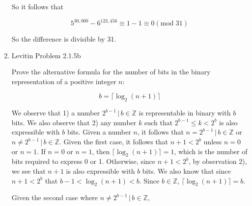 \documentclass[a4paper,12pt]{article}
\begin{document}
\begin{enumerate}
    So it follows that

    $$5^{30,000} - 6^{123,456} \equiv 1 - 1 \equiv 0 (\text{mod } 31)$$

    So the difference is divisible by 31.

    \item Levitin Problem 2.1.5b

    Prove the alternative formula for the number of bits in the binary representation of a positive integer $n$:

    $$b = \lceil \log_2(n+1)\rceil$$

    We observe that 1) a number $2^{b-1} \,|\, b \in \mathds{Z}$ is representable in binary with $b$ bits. We also observe that 2) any number $k$ such that $2^{b-1} \leq k < 2^b$ is also expressible with $b$ bits. Given a number $n$, it follows that $n = 2^{b-1}\,|\, b \in \mathds{Z}$ or $n \not = 2^{b-1}\,|\, b \in \mathds{Z}$. Given the first case, it follows that $n+1 < 2^b$ unless $n = 0$ or $n = 1$. If $n = 0$ or $n = 1$, then $\lceil \log_2(n+1)\rceil = 1$, which is the number of bits required to express 0 or 1. Otherwise, since $n + 1 < 2^b$, by observation 2), we see that $n + 1$ is also expressible with $b$ bits. We also know that since $n+1 < 2^b$ that $b -1 < \log_2 (n+1) < b$. Since $b \in \mathds{Z}$, $\lceil \log_2(n+1)\rceil = b$.

    Given the second case where $n \not = 2^{b-1}\,|\, b \in \mathds{Z}$, 
\end{enumerate}
\end{document}
